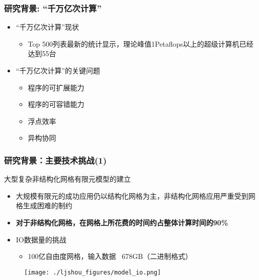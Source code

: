\documentclass[mathserif]{beamer}
\begin{document}
\begin{CJK}{UTF8}{gkai}
\begin{frame}
\frametitle{研究背景: “千万亿次计算”}
  \begin{itemize}
\item “千万亿次计算”现状
   \begin{itemize}
	\item Top 500列表最新的统计显示，理论峰值1Petaflops以上的超级计算机已经达到55台
   \end{itemize} 
   
\item “千万亿次计算”的关键问题
   \begin{itemize}
	\item 程序的可扩展能力
	\item 程序的可容错能力
	\item 浮点效率
	\item 异构协同
   \end{itemize}
  \end{itemize}
\end{frame}

\begin{frame}
	\frametitle{研究背景：主要技术挑战(1)}
	大型复杂非结构化网格有限元模型的建立
	\begin{itemize}
	  \item 大规模有限元的成功应用仍以结构化网格为主，非结构化网格应用严重受到网格生成困难的制约
	  \item {\color{red}\bf 对于非结构化网格，在网格上所花费的时间约占整体计算时间的90\%}
	  \item IO数据量的挑战
	  \begin{itemize}
		\item 100亿自由度网格，输入数据 ~678GB（二进制格式）
	  \end{itemize}
	\end{itemize}
		\begin{figure}
			\centering
			\texttt{[image: ./ljshou\_figures/model\_io.png]}
		\end{figure}
\end{frame}


\end{CJK}
\end{document}
